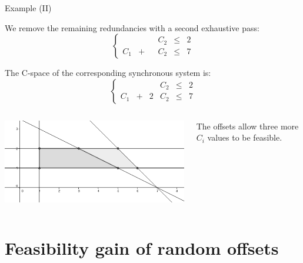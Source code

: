 \documentclass{beamer}
\begin{document}
    \begin{frame}{Example (II)}

    We remove the remaining redundancies with a second exhaustive pass:
    $$
        \left\{
            \begin{array}{cccccc}
                & & & C_2 & \leqslant & 2 \\
                C_1 & + & & C_2 & \leqslant & 7
            \end{array}
        \right.
    $$

    The C-space of the corresponding synchronous system is:
    $$
    \left\{
      \begin{array}{cccccc}
        & & & C_2 & \leqslant & 2 \\
        C_1 & + & 2 & C_2 & \leqslant & 7
      \end{array}
    \right.
    $$

    \begin{columns}[c]


    \includegraphics[width=\textwidth]{figs/cspace_example.png}


    The offsets allow three more $C_i$ values to be feasible.

    \end{columns}

    \end{frame}

\section{Feasibility gain of random offsets}

    \begin{frame}
    \end{frame}
\end{document}
